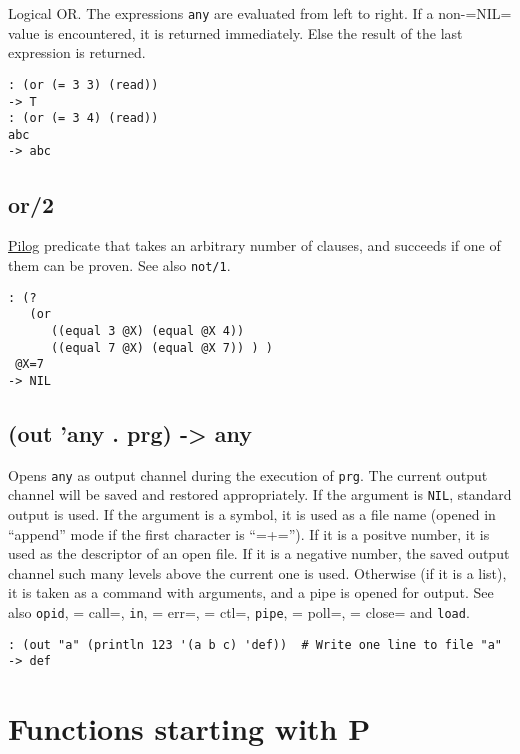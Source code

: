 {{{{{{{Logical OR. The expressions \texttt{any} are evaluated from left to right. If a
non-=NIL= value is encountered, it is returned immediately. Else the
result of the last expression is returned.


\begin{verbatim}
: (or (= 3 3) (read))
-> T
: (or (= 3 4) (read))
abc
-> abc
\end{verbatim}

 
\section{or/2}
\label{sec-8-1-15-16}


\hyperref[ref.html-pilog]{Pilog} predicate that takes an arbitrary number of
clauses, and succeeds if one of them can be proven. See also \texttt{not/1}.


\begin{verbatim}
: (?
   (or
      ((equal 3 @X) (equal @X 4))
      ((equal 7 @X) (equal @X 7)) ) )
 @X=7
-> NIL
\end{verbatim}

 
\section{(out 'any . prg) -> any}
\label{sec-8-1-15-17}


Opens \texttt{any} as output channel during the execution of \texttt{prg}. The current
output channel will be saved and restored appropriately. If the argument
is \texttt{NIL}, standard output is used. If the argument is a symbol, it is
used as a file name (opened in ``append'' mode if the first character is
``=+=''). If it is a positve number, it is used as the descriptor of an
open file. If it is a negative number, the saved output channel such
many levels above the current one is used. Otherwise (if it is a list),
it is taken as a command with arguments, and a pipe is opened for
output. See also \texttt{opid}, = call=, \texttt{in}, = err=, = ctl=, \texttt{pipe}, = poll=,
= close= and \texttt{load}.


\begin{verbatim}
: (out "a" (println 123 '(a b c) 'def))  # Write one line to file "a"
-> def
\end{verbatim}


\chapter{Functions starting with P}
\label{sec-8-1-16}


}}}}}}}
